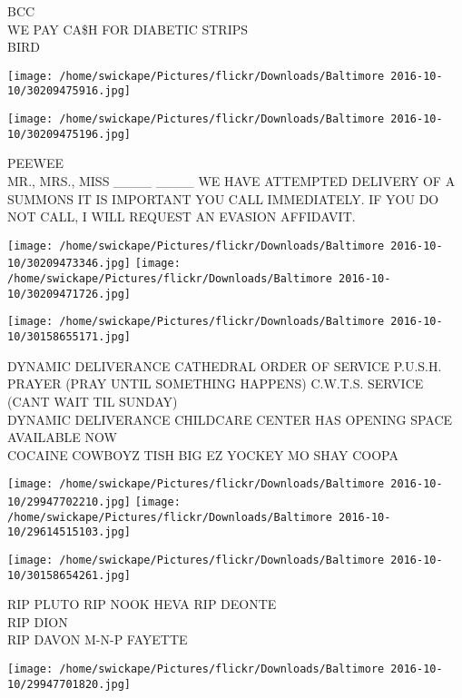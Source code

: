 \documentclass[10pt,letterpaper]{article}
\begin{document}
BCC\\
WE PAY CA\$H FOR DIABETIC STRIPS\\
BIRD\\
\pagebreak

\texttt{[image: /home/swickape/Pictures/flickr/Downloads/Baltimore 2016-10-10/30209475916.jpg]}

\vspace{0.25in}
\texttt{[image: /home/swickape/Pictures/flickr/Downloads/Baltimore 2016-10-10/30209475196.jpg]}

PEEWEE\\
MR., MRS., MISS \_\_\_\_ \_\_\_\_ WE HAVE ATTEMPTED DELIVERY OF A SUMMONS IT IS IMPORTANT YOU CALL IMMEDIATELY.  IF YOU DO NOT CALL, I WILL REQUEST AN EVASION AFFIDAVIT.\\
\pagebreak

\texttt{[image: /home/swickape/Pictures/flickr/Downloads/Baltimore 2016-10-10/30209473346.jpg]}
\texttt{[image: /home/swickape/Pictures/flickr/Downloads/Baltimore 2016-10-10/30209471726.jpg]}

\vspace{0.25in}
\texttt{[image: /home/swickape/Pictures/flickr/Downloads/Baltimore 2016-10-10/30158655171.jpg]}

DYNAMIC DELIVERANCE CATHEDRAL ORDER OF SERVICE P.U.S.H. PRAYER (PRAY UNTIL SOMETHING HAPPENS) C.W.T.S. SERVICE (CANT WAIT TIL SUNDAY)\\
DYNAMIC DELIVERANCE CHILDCARE CENTER HAS OPENING  SPACE AVAILABLE NOW\\
COCAINE COWBOYZ TISH BIG EZ YOCKEY MO SHAY COOPA\\
\pagebreak

\texttt{[image: /home/swickape/Pictures/flickr/Downloads/Baltimore 2016-10-10/29947702210.jpg]}
\texttt{[image: /home/swickape/Pictures/flickr/Downloads/Baltimore 2016-10-10/29614515103.jpg]}

\texttt{[image: /home/swickape/Pictures/flickr/Downloads/Baltimore 2016-10-10/30158654261.jpg]}

RIP PLUTO RIP NOOK HEVA RIP DEONTE\\
RIP DION\\
RIP DAVON M{-}N{-}P FAYETTE\\
\pagebreak

\texttt{[image: /home/swickape/Pictures/flickr/Downloads/Baltimore 2016-10-10/29947701820.jpg]}
\end{document}
